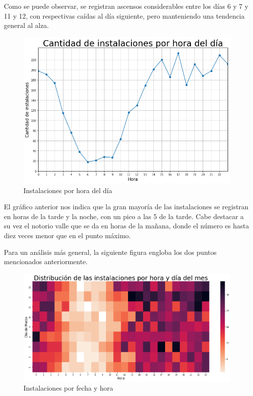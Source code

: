 \documentclass[a4paper, 12pt]{article}
\begin{document}
		Como se puede observar, se registran ascensos considerables entre los días 6 y 7 y 11 y 12, con respectivas caídas al día siguiente, pero manteniendo una tendencia general al alza.

		\FloatBarrier
		\begin{figure}[h]
			\centering
			\includegraphics[width=\textwidth]{images/installs/installsxhora.png}
			\caption{Instalaciones por hora del día}
		\end{figure}
		\FloatBarrier

		 El gráfico anterior nos indica que la gran mayoría de las instalaciones se registran en horas de la tarde y la noche, con un pico a las 5 de la tarde. Cabe destacar a su vez el notorio valle que se da en horas de la mañana, donde el número es hasta diez veces menor que en el punto máximo.

		 Para un análisis más general, la siguiente figura engloba los dos puntos mencionados anteriormente.

		\FloatBarrier
		\begin{figure}[h]
			\centering
			\includegraphics[width=\textwidth]{images/installs/heatmapfecha.png}
			\caption{Instalaciones por fecha y hora}
		\end{figure}
		\FloatBarrier
\end{document}
